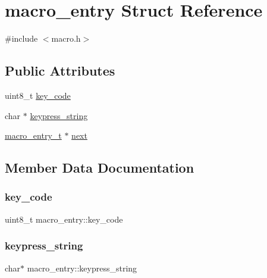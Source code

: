 \hypertarget{structmacro__entry}{}\section{macro\+\_\+entry Struct Reference}
\label{structmacro__entry}


{\ttfamily \#include $<$macro.\+h$>$}

\subsection*{Public Attributes}
\begin{DoxyCompactItemize}
\item 
uint8\+\_\+t \hyperlink{structmacro__entry_a898801c7d1cb85d7dee0b303420d683b}{key\+\_\+code}
\item 
char $\ast$ \hyperlink{structmacro__entry_a62ee5f337d1d0170a7cf00117b156f80}{keypress\+\_\+string}
\item 
\hyperlink{macro_8h_af543547a5956dde30bf18b61541fba80}{macro\+\_\+entry\+\_\+t} $\ast$ \hyperlink{structmacro__entry_a47cecf100892574702f3c1ff13ff8619}{next}
\end{DoxyCompactItemize}


\subsection{Member Data Documentation}
\mbox{\label{structmacro__entry_a898801c7d1cb85d7dee0b303420d683b}} 
\subsubsection{\texorpdfstring{key\+\_\+code}{key\_code}}
{\footnotesize\ttfamily uint8\+\_\+t macro\+\_\+entry\+::key\+\_\+code}

\mbox{\label{structmacro__entry_a62ee5f337d1d0170a7cf00117b156f80}} 
\subsubsection{\texorpdfstring{keypress\+\_\+string}{keypress\_string}}
{\footnotesize\ttfamily char$\ast$ macro\+\_\+entry\+::keypress\+\_\+string}

